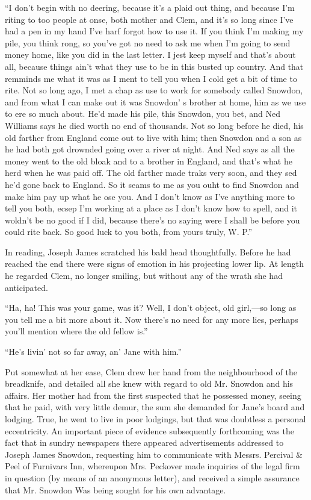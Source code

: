 ``I don't begin with no deering, because it's a plaid out thing, and
because I'm riting to too people at onse, both mother and Clem, and it's
so long since I've had a pen in my hand I've harf forgot how to use it.
If you think I'm making my pile, you think rong, so you've got no need
to ask me when I'm going to send money home, like you did in the last
letter. I jest keep myself and that's about all, because things ain't
what they use to be {\protect\hypertarget{69}{}{}}in this busted up
country. And that remminds me what it was as I ment to tell you when I
cold get a bit of time to rite. Not so long ago, I met a chap as use to
work for somebody called Snowdon, and from what I can make out it was
Snowdon' s brother at home, him as we use to ere so much about. He'd
made his pile, this Snowdon, you bet, and Ned Williams says he died
worth no end of thousands. Not so long before he died, his old farther
from England come out to live with him; then Snowdon and a son as he had
both got drownded going over a river at night. And Ned says as all the
money went to the old bloak and to a brother in England, and that's what
he herd when he was paid off. The old farther made traks very soon, and
they sed he'd gone back to England. So it seams to me as you ouht to
find Snowdon and make him pay up what he ose you. And I don't know as
I've anything more to tell you both, ecsep I'm working at a place as I
don't know how to spell, and it woldn't be no good if I did, because
there's no saying were I {\protect\hypertarget{70}{}{}}shall be before
you could rite back. So good luck to you both, from yours truly, W. P.''

In reading, Joseph James scratched his bald head thoughtfully. Before he
had reached the end there were signs of emotion in his projecting lower
lip. At length he regarded Clem, no longer smiling, but without any of
the wrath she had anticipated.

``Ha, ha! This was your game, was it? Well, I don't object, old
girl,---so long as you tell me a bit more about it. Now there's no need
for any more lies, perhaps you'll mention where the old fellow is.''

``He's livin' not so far away, an' Jane with him.''

Put somewhat at her ease, Clem drew her hand from the neighbourhood of
the breadknife, and detailed all she knew with regard to old Mr. Snowdon
and his affairs. Her mother had from the first suspected that he
possessed money, seeing that he paid, with very little demur, the sum
she demanded for Jane's board and lodging. True, he went to live in poor
lodgings, but that was doubtless a
{\protect\hypertarget{71}{}{}}personal eccentricity. An important piece
of evidence subsequently forthcoming was the fact that in sundry
newspapers there appeared advertisements addressed to Joseph James
Snowdon, requesting him to communicate with Messrs. Percival \& Peel of
Furnivars Inn, whereupon Mrs. Peckover made inquiries of the legal firm
in question (by means of an anonymous letter), and received a simple
assurance that Mr. Snowdon Was being sought for his own advantage.

